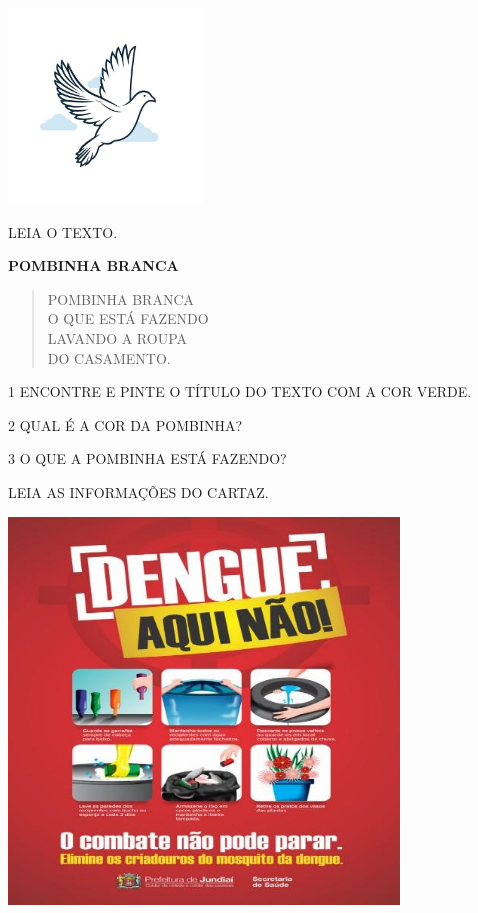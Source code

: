 
\includegraphics[width=2.02153in,height=2.05208in]{media/image126.jpg}

LEIA O TEXTO.

\textbf{POMBINHA BRANCA}

\begin{verse}
POMBINHA BRANCA\\
O QUE ESTÁ FAZENDO\\
LAVANDO A ROUPA\\
DO CASAMENTO.
\end{verse}



\num{1} ENCONTRE E PINTE O TÍTULO DO TEXTO COM A COR VERDE.

\num{2} QUAL É A COR DA POMBINHA?


\num{3} O QUE A POMBINHA ESTÁ FAZENDO?


LEIA AS INFORMAÇÕES DO CARTAZ.

\includegraphics[width=4.08681in,height=4.04722in]{media/image127.jpg}

